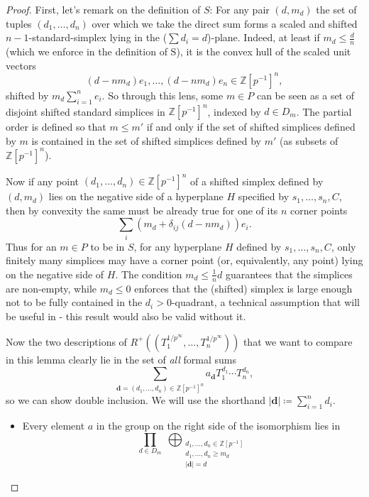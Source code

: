 \documentclass[10pt,twoside]{article}
\numberwithin{equation}{section}
\theoremstyle{plain}
\theoremstyle{definition}
\newcommand{\ZZ}{\mathbb{Z}}
\newcommand{\pRoots}{{1/p^\infty}}
\newcommand{\ZZip}{\ZZ[p^{-1}]}
\begin{document}
\begin{proof}
    First, let's remark on the definition of \(S\): For any pair \((d,m_d)\) the set of tuples \((d_1,\dots,d_n)\) over which we take the direct sum forms a scaled and shifted \(n-1\)-standard-simplex lying in the (\(\sum d_i = d\))-plane. Indeed, at least if \(m_d\leq \frac dn\) (which we enforce in the definition of S), it is the convex hull of the scaled unit vectors 
    \[(d-nm_d)e_1,\dots, (d-nm_d)e_n\in \ZZip^n,\]
    shifted by \(m_d\sum_{i=1}^n e_i\). So through this lens, some \(m\in P\) can be seen as a set of disjoint shifted standard simplices in \(\ZZip^n\), indexed by \(d\in D_m\). The partial order is defined so that \(m\leq m'\) if and only if the set of shifted simplices defined by \(m\) is contained in the set of shifted simplices defined by \(m'\) (as subsets of \(\ZZip^n\)).\par
    Now if any point \((d_1,\dots,d_n)\in \ZZip^n\) of a shifted simplex defined by \((d, m_d)\) lies on the negative side of a hyperplane \(H\) specified by \(s_1,\dots,s_n,C\), then by convexity the same must be already true for one of its \(n\) corner points 
    \[\sum_i(m_d + \delta_{ij}(d-nm_d))e_i.\] 
    Thus for an \(m\in P\) to be in \(S\), for any hyperplane \(H\) defined by \(s_1,\dots,s_n,C\), only finitely many simplices may have a corner point (or, equivalently, any point) lying on the negative side of \(H\). The condition \(m_d\leq \frac 1n d\) guarantees that the simplices are non-empty, while \(m_d\leq 0\) enforces that the (shifted) simplex is large enough not to be fully contained in the \(d_i>0\)-quadrant, a technical assumption that will be useful in  - this result would also be valid without it.\par
    Now the two descriptions of \(R^+((T^{\pRoots}_1,\dots,T_n^{\pRoots}))\) that we want to compare in this lemma clearly lie in the set of \emph{all} formal sums
    \[\sum_{\mathbf{d}=(d_1,\dots,d_n)\in \ZZip^n}a_{\mathbf{d}}^{}T_1^{d_1}\cdots T_n^{d_n},\]
    so we can show double inclusion. We will use the shorthand \(|\mathbf d|\coloneqq \sum_{i=1}^n d_i\).
    \begin{itemize}
        \item["\(\supseteq\)":]  Every element \(a\) in the group on the right side of the isomorphism lies in
        \[\prod_{d\in D_m}
        \;\bigoplus_{\substack{d_1,\dots,d_n\in \ZZ[p^{-1}]\\
        d_1,\dots,d_n\geq m_d\\
        |\mathbf d|=d}}
\]
\end{itemize}
\end{proof}
\end{document}
